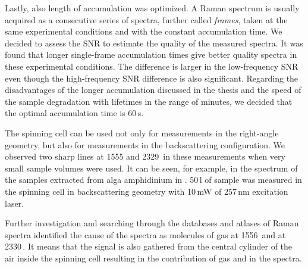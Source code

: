 Lastly, also length of accumulation was optimized.
A Raman spectrum is usually acquired as a consecutive series of spectra,
further called \emph{frames}, taken at the same experimental conditions and
with the constant accumulation time.
We decided to assess the SNR to estimate the quality of the measured spectra.
It was found that longer single-frame accumulation times give better quality
spectra in these experimental conditions.
The difference is larger in the low-frequency SNR even though the
high-frequency SNR difference is also significant.
Regarding the disadvantages of the
longer accumulation discussed in the thesis and the speed of
the sample degradation with lifetimes in the range of minutes, we decided that
the optimal accumulation time is 60\,s.

The spinning cell can be used not only for measurements in the right-angle
geometry, but also for measurements in the backscattering configuration.
We observed two sharp lines at 1555 and 2329\,\icm{} in these measurements
when very small sample volumes were used.
It can be seen, for example, in the spectrum of the samples extracted from alga
amphidinium in
.
50\,l of sample was measured in the spinning cell in backscattering
geometry with 10\,mW of 257\,nm excitation laser.

\begin{figure}
	\centering
	
	\caption[%
		Spectrum of extract from alga amphidinium in the spinning cell in
		backscattering geometry with 257\,nm excitation laser.%
	]{%
	}
	\label{\figlabel{artefact:artefact_amphidinium}}
\end{figure}

Further investigation and searching through the databases and atlases of
Raman spectra identified the cause of the spectra as molecules of gas 
at 1556\,\icm{} and  at 2330\,\icm{}.
It means that the signal is also gathered from the central cylinder of the air
inside the spinning cell resulting in the contribution of gas  and
 in the spectra.
